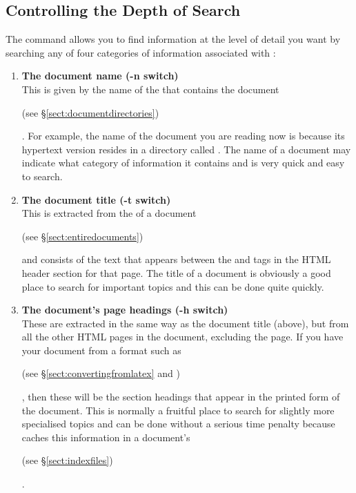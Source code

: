 \subsection{\label{sect:depthofsearch}Controlling the Depth of Search}

The  command allows you to find information at
the level of detail you want by searching any of four categories of
information associated with :

\begin{enumerate}

\item \label{sect:searchname}{\bf The document name (-n
switch)}\mbox{}\\ This is given by the name of the
 that contains the
document\begin{latexonly}
(see \S\ref{sect:documentdirectories})
\end{latexonly}.
For example, the name of the document you are reading now is
 because its hypertext version resides in
a directory called . The name of a document may
indicate what category of information it contains and is very quick
and easy to search.

\item \label{sect:searchtitle}{\bf The document title (-t
switch)}\mbox{}\\ This is extracted from the  of a document\begin{latexonly}
(see \S\ref{sect:entiredocuments})
\end{latexonly}
and consists of the text that appears between the  and
 tags in the HTML header section for that page. The
title of a document is obviously a good place to search for important
topics and this can be done quite quickly.

\item \label{sect:searchheading}{\bf The document's page headings (-h
switch)}\mbox{}\\ These are extracted in the same way as the document
title (above), but from all the other HTML pages in the document,
excluding the  page. If you have
 your document from a
format such as \begin{latexonly}
(see \S\ref{sect:convertingfromlatex} and )
\end{latexonly}, then these will be the section headings
that appear in the printed form of the document. This is normally a
fruitful place to search for slightly more specialised topics and can
be done without a serious time penalty because 
caches this information in a document's \begin{latexonly}
(see \S\ref{sect:indexfiles})
\end{latexonly}.


\end{enumerate}

